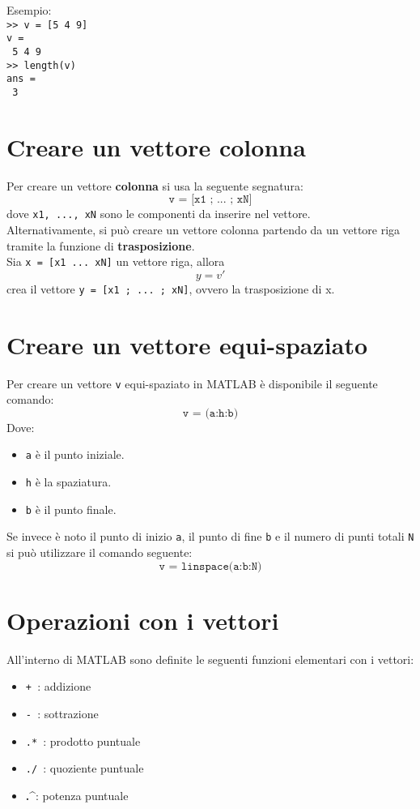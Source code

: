 \documentclass[12pt,a4paper,oneside]{book}
\begin{document}
Esempio: \\
\texttt{>> v = [5 4 9]} \\
\texttt{v = } \\
\texttt{\hspace{0.5cm} 5 \hspace{0.5cm} 4 \hspace{0.5cm} 9} \\
\texttt{>> length(v)} \\
\texttt{ans = } \\
\texttt{\hspace{0.5cm} 3} \break


\section{Creare un vettore colonna}
Per creare un vettore \textbf{colonna} si usa la seguente segnatura:
$$ \texttt{v = [x1 ; ... ; xN]} $$
dove \texttt{x1, ..., xN} sono le componenti da inserire nel vettore. \\
Alternativamente, si può creare un vettore colonna partendo da un vettore riga tramite la funzione di \textbf{trasposizione}. \\
Sia \texttt{x = [x1 ... xN]} un vettore riga, allora 
$$ y = v' $$
crea il vettore \texttt{y = [x1 ; ... ; xN]}, ovvero la trasposizione di x.

\newpage

\section{Creare un vettore equi-spaziato}
Per creare un vettore \texttt{v} equi-spaziato in MATLAB è disponibile il seguente comando:
$$ \texttt{v = (a:h:b)} $$
Dove:
\begin{itemize}
	\item 	\texttt{a} è il punto iniziale.
	\item	\texttt{h} è la spaziatura.
	\item	\texttt{b} è il punto finale.
\end{itemize}

Se invece è noto il punto di inizio \texttt{a}, il punto di fine \texttt{b} e il numero di punti totali \texttt{N} si può utilizzare il comando seguente:
$$ \texttt{v = linspace(a:b:N)} $$


\section{Operazioni con i vettori}
All'interno di MATLAB sono definite le seguenti funzioni elementari con i vettori:
\begin{itemize}

	\item	\texttt{+ }: addizione
	\item	\texttt{- }: sottrazione
	\item	\texttt{.* }: prodotto puntuale
	\item	\texttt{./ }: quoziente puntuale
	\item	\textbf{.\^}: potenza puntuale

\end{itemize}
\end{document}
